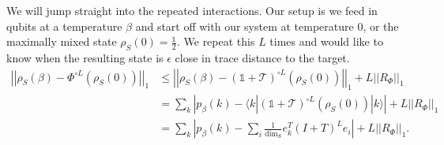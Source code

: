\documentclass{article}
\newcommand{\ket}[1]{|#1\rangle}
\newcommand{\bra}[1]{\langle #1|}
\newcommand{\norm}[1]{\left| \left| #1 \right| \right|}
\newcommand{\identity}{\mathds{1}}
\begin{document}
We will jump straight into the repeated interactions. Our setup is we feed in qubits at a temperature $\beta$ and start off with our system at temperature $0$, or the maximally mixed state $\rho_S(0) = \frac{\identity}{2}$. We repeat this $L$ times and would like to know when the resulting state is $\epsilon$ close in trace distance to the target. 
\begin{align}
    \norm{\rho_S(\beta) - \Phi^{\circ L}(\rho_S(0))}_1 &\leq \norm{\rho_S(\beta) - (\identity + \mathcal{T})^{\circ L}(\rho_S(0))}_1 + L \norm{R_{\Phi}}_1 \\
    &= \sum_{k} \left| p_{\beta}(k) - \bra{k} (\identity + \mathcal{T})^{\circ L}(\rho_S(0)) \ket{k} \right| + L \norm{R_{\Phi}}_1 \\
    &= \sum_k \left| p_{\beta}(k) - \sum_i \frac{1}{\dim_S} e_k^T (I + T)^L e_i \right| + L \norm{R_{\Phi}}_1. 
\end{align}
\end{document}
